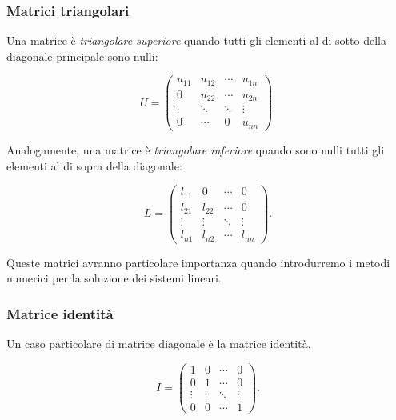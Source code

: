 \subsubsection{Matrici triangolari}

Una matrice è \emph{triangolare superiore} quando tutti gli
elementi al di sotto della diagonale principale sono nulli:

\begin{equation*}
U =
\begin{pmatrix}
u_{11} & u_{12} & \cdots & u_{1n} \\
0      & u_{22} & \cdots & u_{2n} \\
\vdots & \ddots & \ddots & \vdots \\
0      & \cdots & 0      & u_{nn}
\end{pmatrix}.
\end{equation*}

Analogamente, una matrice è \emph{triangolare inferiore} quando
sono nulli tutti gli elementi al di sopra della diagonale:

\begin{equation*}
L =
\begin{pmatrix}
l_{11} & 0      & \cdots & 0 \\
l_{21} & l_{22} & \cdots & 0 \\
\vdots & \vdots & \ddots & \vdots \\
l_{n1} & l_{n2} & \cdots & l_{nn}
\end{pmatrix}.
\end{equation*}

Queste matrici avranno particolare importanza quando introdurremo
i metodi numerici per la soluzione dei sistemi lineari.


\subsubsection{Matrice identità}

Un caso particolare di matrice diagonale è la matrice identità,

\begin{equation*}
I =
\begin{pmatrix}
1 & 0 & \cdots & 0 \\
0 & 1 & \cdots & 0 \\
\vdots & \vdots & \ddots & \vdots \\
0 & 0 & \cdots & 1
\end{pmatrix}.
\end{equation*}

